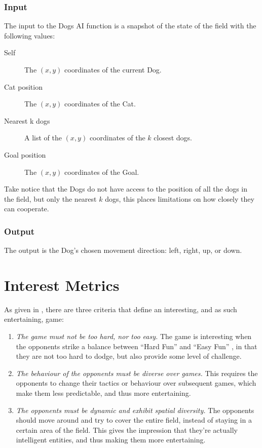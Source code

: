 \subsubsection{Input}
\label{sec:input}

The input to the Dogs AI function is a snapshot of the state of the field with
the following values:

\begin{description}
\item[Self] The \((x,y)\) coordinates of the current Dog.
\item[Cat position] The \((x,y)\) coordinates of the Cat.
\item[Nearest k dogs] A list of the \((x,y)\) coordinates of the \(k\) closest
  dogs.
\item[Goal position] The \((x,y)\) coordinates of the Goal.
\end{description}

Take notice that the Dogs do not have access to the position of all the dogs in
the field, but only the nearest \(k\) dogs, this places limitations on how
closely they can cooperate.

\subsubsection{Output}
\label{sec:output}

The output is the Dog's chosen movement direction: left, right, up, or down.


\section{Interest Metrics}
\label{sec:interest-metrics}

As given in \citet{yannakakis2005ai}, there are three criteria that define an
interesting, and as such entertaining, game:

\begin{enumerate}
\item \emph{The game must not be too hard, nor too easy.} The game is
  interesting when the opponents strike a balance between ``Hard Fun'' and
  ``Easy Fun'' \citep{lazzaro2004we}, in that they are not too hard to dodge,
  but also provide some level of challenge.
\item \emph{The behaviour of the opponents must be diverse over games.} This
  requires the opponents to change their tactics or behaviour over subsequent
  games, which make them less predictable, and thus more entertaining.
\item \emph{The opponents must be dynamic and exhibit spatial diversity.} The
  opponents should move around and try to cover the entire field, instead of
  staying in a certain area of the field. This gives the impression that they're
  actually intelligent entities, and thus making them more entertaining.
\end{enumerate}

